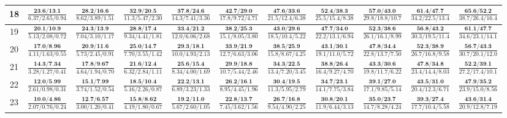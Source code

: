 \documentclass{slides}
\begin{document}
{{{\begin{tabular}{|c|c|c|c|c|c|c|c|c|c|c|}
\hline
18 & $\frac{\textbf{23.6/13.1}}{6.37/2.65/0.94}$ & $\frac{\textbf{28.2/16.6}}{8.62/3.89/1.51}$ & $\frac{\textbf{32.9/20.5}}{11.3/5.47/2.30}$ & $\frac{\textbf{37.8/24.6}}{14.3/7.41/3.36}$ & $\frac{\textbf{42.7/29.0}}{17.8/9.72/4.71}$ & $\frac{\textbf{47.6/33.6}}{21.5/12.4/6.38}$ & $\frac{\textbf{52.4/38.3}}{25.5/15.4/8.38}$ & $\frac{\textbf{57.0/43.0}}{29.8/18.8/10.7}$ & $\frac{\textbf{61.4/47.7}}{34.2/22.5/13.4}$ & $\frac{\textbf{65.6/52.2}}{38.7/26.4/16.4}$ \\
\hline
19 & $\frac{\textbf{20.1/10.9}}{5.13/2.08/0.72}$ & $\frac{\textbf{24.3/13.9}}{7.04/3.10/1.17}$ & $\frac{\textbf{28.8/17.4}}{9.34/4.41/1.81}$ & $\frac{\textbf{33.4/21.2}}{12.0/6.06/2.68}$ & $\frac{\textbf{38.2/25.3}}{15.1/8.05/3.80}$ & $\frac{\textbf{43.0/29.6}}{18.5/10.4/5.22}$ & $\frac{\textbf{47.7/34.0}}{22.2/13.1/6.94}$ & $\frac{\textbf{52.3/38.6}}{26.1/16.1/8.99}$ & $\frac{\textbf{56.8/43.2}}{30.3/19.5/11.4}$ & $\frac{\textbf{61.1/47.7}}{34.6/23.1/14.1}$ \\
\hline
20 & $\frac{\textbf{17.0/8.96}}{4.11/1.63/0.55}$ & $\frac{\textbf{20.9/11.6}}{5.73/2.45/0.91}$ & $\frac{\textbf{25.0/14.7}}{7.70/3.55/1.42}$ & $\frac{\textbf{29.3/18.1}}{10.0/4.93/2.13}$ & $\frac{\textbf{33.9/21.9}}{12.7/6.63/3.06}$ & $\frac{\textbf{38.5/25.9}}{15.8/8.67/4.25}$ & $\frac{\textbf{43.1/30.1}}{19.1/11.0/5.72}$ & $\frac{\textbf{47.8/34.4}}{22.8/13.7/7.50}$ & $\frac{\textbf{52.3/38.9}}{26.7/16.8/9.58}$ & $\frac{\textbf{56.7/43.3}}{30.7/20.1/12.0}$ \\
\hline
21 & $\frac{\textbf{14.3/7.34}}{3.28/1.27/0.41}$ & $\frac{\textbf{17.8/9.67}}{4.64/1.94/0.70}$ & $\frac{\textbf{21.6/12.4}}{6.32/2.84/1.11}$ & $\frac{\textbf{25.6/15.4}}{8.34/4.00/1.69}$ & $\frac{\textbf{29.9/18.8}}{10.7/5.44/2.46}$ & $\frac{\textbf{34.3/22.5}}{13.4/7.20/3.45}$ & $\frac{\textbf{38.8/26.4}}{16.4/9.27/4.70}$ & $\frac{\textbf{43.3/30.6}}{19.8/11.7/6.22}$ & $\frac{\textbf{47.8/34.8}}{23.4/14.4/8.03}$ & $\frac{\textbf{52.2/39.1}}{27.2/17.4/10.1}$ \\
\hline
22 & $\frac{\textbf{12.0/5.99}}{2.61/0.98/0.31}$ & $\frac{\textbf{15.1/7.99}}{3.74/1.52/0.54}$ & $\frac{\textbf{18.5/10.4}}{5.16/2.26/0.87}$ & $\frac{\textbf{22.2/13.1}}{6.89/3.23/1.33}$ & $\frac{\textbf{26.2/16.1}}{8.95/4.45/1.96}$ & $\frac{\textbf{30.4/19.5}}{11.3/5.95/2.79}$ & $\frac{\textbf{34.7/23.1}}{14.1/7.75/3.84}$ & $\frac{\textbf{39.1/27.0}}{17.1/9.85/5.14}$ & $\frac{\textbf{43.5/31.0}}{20.4/12.3/6.71}$ & $\frac{\textbf{47.9/35.2}}{23.9/15.0/8.56}$ \\
\hline
23 & $\frac{\textbf{10.0/4.86}}{2.07/0.76/0.24}$ & $\frac{\textbf{12.7/6.57}}{3.00/1.20/0.41}$ & $\frac{\textbf{15.8/8.62}}{4.19/1.80/0.67}$ & $\frac{\textbf{19.2/11.0}}{5.67/2.60/1.05}$ & $\frac{\textbf{22.8/13.7}}{7.45/3.62/1.56}$ & $\frac{\textbf{26.7/16.8}}{9.54/4.90/2.25}$ & $\frac{\textbf{30.8/20.1}}{11.9/6.44/3.13}$ & $\frac{\textbf{35.0/23.7}}{14.7/8.28/4.24}$ & $\frac{\textbf{39.3/27.4}}{17.7/10.4/5.58}$ & $\frac{\textbf{43.6/31.4}}{20.9/12.8/7.19}$ \\

\end{tabular}}}}
\end{document}
